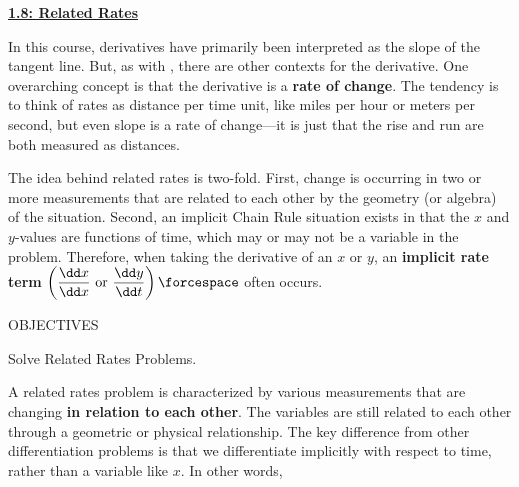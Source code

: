 \textbf{\underline{\large{1.8: Related Rates}}} \par

In this course, derivatives have primarily been interpreted as the slope of the tangent line. But, as with \href{https://www.merriam-webster.com/dictionary/rectilinear\%20motion}{\text{\textcolor{blue}{rectilinear motion}}}, there are other contexts for the derivative. One overarching concept is that the derivative is a \textbf{rate of change}. The tendency is to think of rates as distance per time unit, like miles per hour or meters per second, but even slope is a rate of change---it is just that the rise and run are both measured as distances. \par

The idea behind related rates is two-fold. First, change is occurring in two or more measurements that are related to each other by the geometry (or algebra) of the situation. Second, an implicit Chain Rule situation exists in that the $x$ and $y$-values are functions of time, which may or may not be a variable in the problem. Therefore, when taking the derivative of an $x$ or $y$, an \textbf{implicit rate term} $\left(\dfrac{\dd x}{\dd x} \text{ or } \dfrac{\dd y}{\dd t}\right) \forcespace$ often occurs. \par

\begin{tcolorbox}[objective]
    \begin{center}
        OBJECTIVES \\[11pt]
    \end{center}
    Solve Related Rates Problems.
\end{tcolorbox}

A related rates problem is characterized by various measurements that are changing \textbf{in relation to each other}. The variables are still related to each other through a geometric or physical relationship. The key difference from other differentiation problems is that we differentiate implicitly with respect to time, rather than a variable like $x$. In other words, 

\begin{center}  
\end{center}

